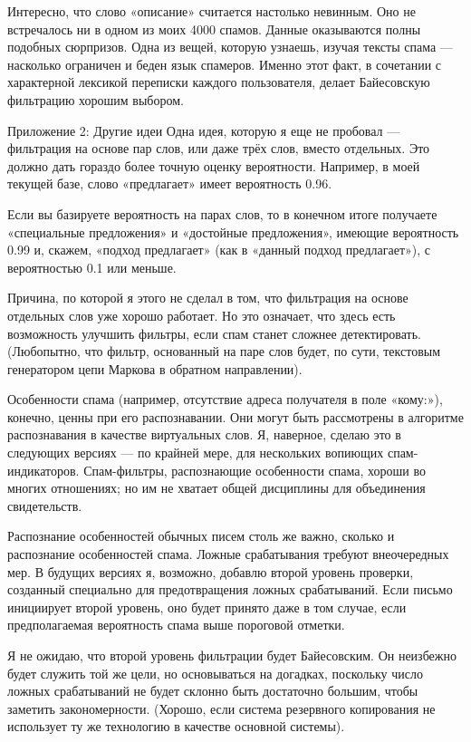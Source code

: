 \documentclass[ebook,12pt,oneside,openany]{memoir}
\begin{document}
Интересно, что слово «описание» считается настолько невинным. Оно не
встречалось ни в одном из моих 4000 спамов. Данные оказываются полны
подобных сюрпризов. Одна из вещей, которую узнаешь, изучая тексты
спама — насколько ограничен и беден язык спамеров. Именно этот факт, в
сочетании с характерной лексикой переписки каждого пользователя,
делает Байесовскую фильтрацию хорошим выбором.

Приложение 2: Другие идеи Одна идея, которую я еще не пробовал —
фильтрация на основе пар слов, или даже трёх слов, вместо отдельных.
Это должно дать гораздо более точную оценку вероятности. Например, в
моей текущей базе, слово «предлагает» имеет вероятность 0.96.

Если вы базируете вероятность на парах слов, то в конечном итоге
получаете «специальные предложения» и «достойные предложения», имеющие
вероятность 0.99 и, скажем, «подход предлагает» (как в «данный подход
предлагает»), с вероятностью 0.1 или меньше.

Причина, по которой я этого не сделал в том, что фильтрация на основе
отдельных слов уже хорошо работает. Но это означает, что здесь есть
возможность улучшить фильтры, если спам станет сложнее детектировать.
(Любопытно, что фильтр, основанный на паре слов будет, по сути,
текстовым генератором цепи Маркова в обратном направлении).

Особенности спама (например, отсутствие адреса получателя в поле
«кому:»), конечно, ценны при его распознавании. Они могут быть
рассмотрены в алгоритме распознавания в качестве виртуальных слов. Я,
наверное, сделаю это в следующих версиях — по крайней мере, для
нескольких вопиющих спам-индикаторов. Спам-фильтры, распознающие
особенности спама, хороши во многих отношениях; но им не хватает общей
дисциплины для объединения свидетельств.

Распознание особенностей обычных писем столь же важно, сколько и
распознание особенностей спама. Ложные срабатывания требуют
внеочередных мер. В будущих версиях я, возможно, добавлю второй
уровень проверки, созданный специально для предотвращения ложных
срабатываний. Если письмо инициирует второй уровень, оно будет принято
даже в том случае, если предполагаемая вероятность спама выше
пороговой отметки.

Я не ожидаю, что второй уровень фильтрации будет Байесовским. Он
неизбежно будет служить той же цели, но основываться на догадках,
поскольку число ложных срабатываний не будет склонно быть достаточно
большим, чтобы заметить закономерности. (Хорошо, если система
резервного копирования не использует ту же технологию в качестве
основной системы).
\end{document}
